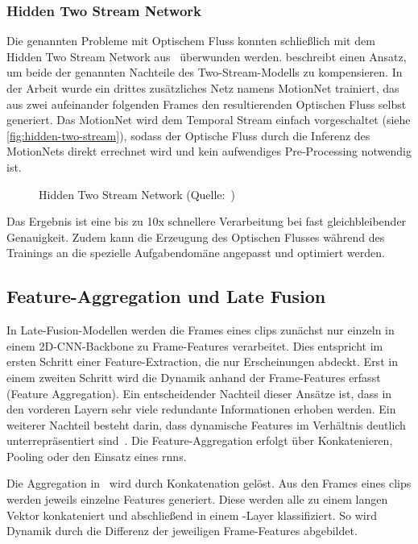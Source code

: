 \subsubsection{Hidden Two Stream Network}

Die genannten Probleme mit Optischem Fluss konnten schließlich mit dem Hidden Two Stream Network aus~\cite{Zhu17} überwunden werden.
\cite{Zhu17} beschreibt einen Ansatz, um beide der genannten Nachteile des Two-Stream-Modells zu kompensieren.
In der Arbeit wurde ein drittes zusätzliches Netz namens MotionNet trainiert, das aus zwei aufeinander folgenden Frames den resultierenden Optischen Fluss selbst generiert.
Das MotionNet wird dem Temporal Stream einfach vorgeschaltet (siehe \autoref{fig:hidden-two-stream}), sodass der Optische Fluss durch die Inferenz des MotionNets direkt errechnet wird und kein aufwendiges Pre-Processing notwendig ist.

\begin{figure}[h!]
    \centering
    \caption{Hidden Two Stream Network (Quelle:~\cite{Zhu17})}
    \label{fig:hidden-two-stream}
\end{figure}

Das Ergebnis ist eine bis zu 10x schnellere Verarbeitung bei fast gleichbleibender Genauigkeit.
Zudem kann die Erzeugung des Optischen Flusses während des Trainings an die spezielle Aufgabendomäne angepasst und optimiert werden.

\subsection{Feature-Aggregation und Late Fusion}
\label{subsec:late-fusion}

In Late-Fusion-Modellen werden die Frames eines \glspl{clip} zunächst nur einzeln in einem 2D-CNN-Backbone zu Frame-Features verarbeitet.
Dies entspricht im ersten Schritt einer Feature-Extraction, die nur Erscheinungen abdeckt.
Erst in einem zweiten Schritt wird die Dynamik anhand der Frame-Features erfasst (Feature Aggregation).
Ein entscheidender Nachteil dieser Ansätze ist, dass in den vorderen Layern sehr viele redundante Informationen erhoben werden.
Ein weiterer Nachteil besteht darin, dass dynamische Features im Verhältnis deutlich unterrepräsentiert sind~\cite{Karpathy14}.
Die Feature-Aggregation erfolgt über Konkatenieren, Pooling oder den Einsatz eines \glspl{rnn}.

Die Aggregation in~\cite{Karpathy14} wird durch Konkatenation gelöst.
Aus den Frames eines \glspl{clip} werden jeweils einzelne Features generiert.
Diese werden alle zu einem langen Vektor konkateniert und abschließend in einem \fc-Layer klassifiziert.
So wird Dynamik durch die Differenz der jeweiligen Frame-Features abgebildet.

